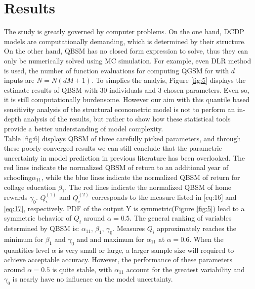 \section{Results} \label{sec:5}
\thispagestyle{plain} %


The study is greatly governed by computer problems. On the one hand, DCDP models are computationally demanding, which is determined by their structure\citep{keane2011ChapterStructuralEstimation}. On the other hand, QBSM has no closed form expression to solve, thus they can only be numerically solved using MC simulation. For example, even DLR method is used, the number of function evaluations for computing QGSM for with $d$ inputs are $ N = N(dM + 1)$. To simplies the analyis, Figure \ref{fig:5} displays the estimate results of QBSM with 30 individuals and 3 chosen parameters. Even so, it is still computationally burdensome. However our aim with this quantile based sensitivity analysis of the structural econometric model is not to perform an in-depth analysis of the results, but rather to show how these statistical tools provide a better understanding of model complexity. \\

\noindent
 Table \ref{fig:6} displays QBSM of three carefully picked parameters, and through these poorly converged results we can still conclude that the parametric uncertainty in model prediction in previous literature has been overlooked. The red lines indicate the normalized QBSM of return to an additional year of schooling$\alpha_{11}$, while the blue lines indicate the normalized QBSM of return for collage education $\beta_1$. The red lines indicate the normalized QBSM of home rewards $\gamma_0$. $Q_{i}^{(1)}$ and  $Q_{i}^{(2)}$ corresponds to the measure listed in \eqref{eq:16} and \eqref{eq:17}, respectively. PDF of the output Y is symmetric(Figure \ref{fig:5}) lead to a symmetric behavior of $Q_i$ around $\alpha =0.5$. The general ranking of variables determined by QBSM is: $\alpha_{11}$, $\beta_1$, $\gamma_0$. Measures $Q_i$ approximately reaches the minimum for $\beta_1$ and $\gamma_0$ and and maximum for $\alpha_{11}$ at $\alpha=0.6$. When the quantities level $\alpha$ is very small or large, a larger sample size will required to achieve acceptable accuracy. However, the performance of these parameters around $\alpha = 0.5$ is quite stable, with $\alpha_{11}$ account for the greatest variability and $\gamma_0$ is nearly have no influence on the model uncertainty.
